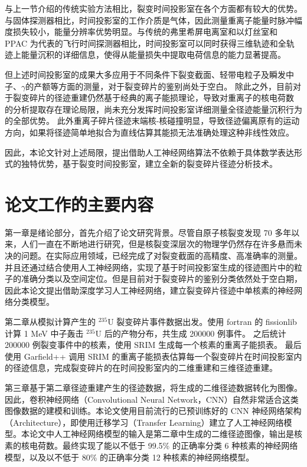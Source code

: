 \documentclass[AutoFakeBold]{LZUThesis}
\begin{document}
与上一节介绍的传统实验方法相比，裂变时间投影室在各个方面都有较大的优势。与固体探测器相比，时间投影室的工作介质是气体，因此测量重离子能量时脉冲幅度损失较小，能量分辨率优势明显。与传统的弗里希屏电离室和以灯丝室和 PPAC 为代表的飞行时间探测器相比，时间投影室可以同时获得三维轨迹和全轨迹上能量沉积的详细信息，使得从能量损失中提取电荷信息的能力显著提高。

但上述时间投影室的成果大多应用于不同条件下裂变截面、轻带电粒子及瞬发中子、$\gamma$的产额等方面的测量，对于裂变碎片的鉴别尚处于空白。
除此之外，目前对于裂变碎片的径迹重建仍然基于经典的离子能损理论，导致对重离子的核电荷数 的分析提取存在理论局限，尚未充分发挥时间投影室详细测量全径迹能量沉积行为的全部优势\cite{魏康2019基于GEM工艺的裂变时间投影室中裂变碎片的讨论}。
此外重离子碎片径迹末端核-核碰撞明显，导致径迹偏离原有的运动方向，如果将径迹简单地拟合为直线估算其能损无法准确处理这种非线性效应。

因此，本论文针对上述局限，提出借助人工神经网络算法不依赖于具体数学表达形式的独特优势，基于裂变时间投影室，建立全新的裂变碎片径迹分析技术。




\section{论文工作的主要内容}
第一章是绪论部分，首先介绍了论文研究背景。尽管自原子核裂变发现 70 多年以来，人们一直在不断地进行研究，但是核裂变深层次的物理学仍然存在许多悬而未决的问题。在实际应用领域，已经完成了对裂变截面的高精度、高准确率的测量。并且还通过结合使用人工神经网络，实现了基于时间投影室生成的径迹图片中的粒子的准确分类以及空间定位。但是目前对于裂变碎片的鉴别分类依然处于空白期，因此本论文提出借助深度学习人工神经网络，建立裂变碎片径迹中单核素的神经网络分类模型。


第二章从模拟计算产生的 $^{235}$U 裂变碎片事件数据出发。使用 fortran 的 fissionlib 计算 1 MeV 中子轰击 $^{235}$U 后的产物分布，共生成 200000 例事件。
之后统计 200000 例裂变事件中的核素，使用 SRIM 生成每一个核素的重离子能损表。
最后使用 Garfield++ 调用 SRIM 的重离子能损表估算每一个裂变碎片在时间投影室内的径迹信息，完成裂变碎片的在时间投影室内的二维重建和三维径迹重建。

第三章基于第二章径迹重建产生的径迹数据，将生成的二维径迹数据转化为图像。因此，卷积神经网络（Convolutional Neural Network，CNN）自然非常适合这类图像数据的建模和训练。本论文使用目前流行的已预训练好的 CNN 神经网络架构（Architecture），即使用迁移学习（Transfer Learning）建立了人工神经网络模型。本论文中人工神经网络模型的输入是第二章中生成的二维径迹图像，输出是核素的核电荷数。最终实现了能以不低于 99.5\% 的正确率分类 6 种核素的神经网络模型，以及以不低于 80\% 的正确率分类 12 种核素的神经网络模型。
\end{document}
